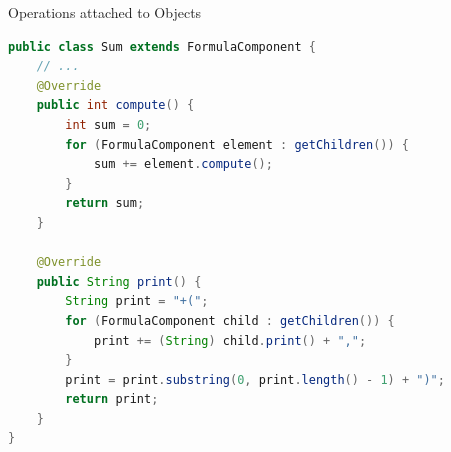 \begin{frame}[fragile]
\begin{fancycolumns}[widths={50,50}, t]
\begin{example}{Operations attached to Objects}
\begin{lstlisting}[language=Java, basicstyle=\scriptsize]
public class Sum extends FormulaComponent {
	// ...
    @Override
    public int compute() {
        int sum = 0;
        for (FormulaComponent element : getChildren()) {
            sum += element.compute();
        }
        return sum;
    }

    @Override
    public String print() {
        String print = "+(";
        for (FormulaComponent child : getChildren()) {
            print += (String) child.print() + ",";
        }
        print = print.substring(0, print.length() - 1) + ")";
        return print;
    }   
}
		\end{lstlisting}
			\vspace{-3mm}
		\end{example}
	\end{fancycolumns}
\end{frame}



%
